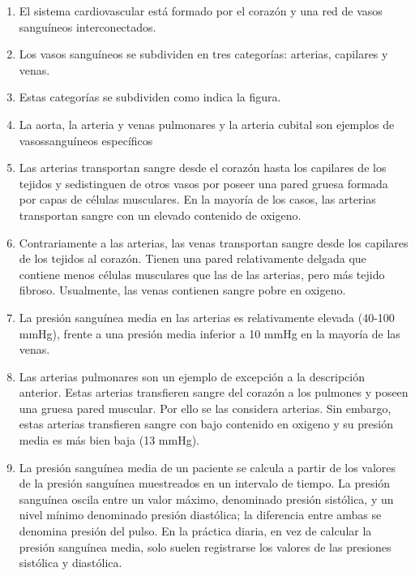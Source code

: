 \documentclass[10pt, a4paper,spanish]{article}
\begin{document}
		\begin{enumerate}
			\item El sistema cardiovascular está formado por el corazón y una red de vasos sanguíneos interconectados.

			\item Los vasos sanguíneos se subdividen en tres categorías: arterias, capilares y venas.

			\item Estas categorías se subdividen como indica la figura.

			\item La aorta, la arteria y venas pulmonares y la arteria cubital son ejemplos de vasossanguíneos específicos

			\item Las arterias transportan sangre desde el corazón hasta los capilares de los tejidos y sedistinguen de otros vasos por poseer una pared gruesa formada por capas de células musculares. En la mayoría de los casos, las arterias transportan sangre con un elevado contenido de oxigeno.

			\item Contrariamente a las arterias, las venas transportan sangre desde los capilares de los tejidos al corazón. Tienen una pared relativamente delgada que contiene menos células musculares que las de las arterias, pero más tejido fibroso. Usualmente, las venas contienen sangre pobre en oxigeno.

			\item La presión sanguínea media en las arterias es relativamente elevada (40-100 mmHg), frente a una presión media inferior a 10 mmHg en la mayoría de las venas.

			\item Las arterias pulmonares son un ejemplo de excepción a la descripción anterior. Estas arterias transfieren sangre del corazón a los pulmones y poseen una gruesa pared muscular. Por ello se las considera arterias. Sin embargo, estas arterias transfieren sangre con bajo contenido en oxigeno y su presión media es más bien baja (13 mmHg).

			\item La presión sanguínea media de un paciente se calcula a partir de los valores de la presión sanguínea muestreados en un intervalo de tiempo. La presión sanguínea oscila entre un valor máximo, denominado presión sistólica, y un nivel mínimo denominado presión diastólica; la diferencia entre ambas se denomina presión del pulso. En la práctica diaria, en vez de calcular la presión sanguínea media, solo suelen registrarse los valores de las presiones sistólica y diastólica.


\end{enumerate}
\end{document}
